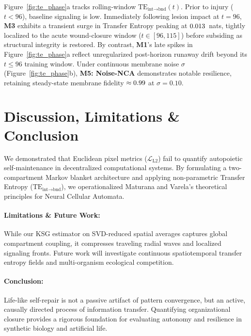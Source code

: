 \documentclass[10pt,twocolumn]{article}
\begin{document}
Figure~\ref{fig:te_phase}a tracks rolling-window $\text{TE}_{\text{int}\to\text{bnd}}(t)$. Prior to injury ($t < 96$), baseline signaling is low. Immediately following lesion impact at $t=96$, \textbf{M3} exhibits a transient surge in Transfer Entropy peaking at $0.013$~nats, tightly localized to the acute wound-closure window ($t \in [96, 115]$) before subsiding as structural integrity is restored. By contrast, \textbf{M1}'s late spikes in Figure~\ref{fig:te_phase}a reflect unregularized post-horizon runaway drift beyond its $t \le 96$ training window. Under continuous membrane noise $\sigma$ (Figure~\ref{fig:te_phase}b), \textbf{M5: Noise-NCA} demonstrates notable resilience, retaining steady-state membrane fidelity $\approx 0.99$ at $\sigma = 0.10$.

\section{Discussion, Limitations \& Conclusion}

We demonstrated that Euclidean pixel metrics ($\mathcal{L}_{\text{L2}}$) fail to quantify autopoietic self-maintenance in decentralized computational systems. By formulating a two-compartment Markov blanket architecture and applying non-parametric Transfer Entropy ($\text{TE}_{\text{int}\to\text{bnd}}$), we operationalized Maturana and Varela's theoretical principles for Neural Cellular Automata. 

\paragraph{Limitations \& Future Work:} While our KSG estimator on SVD-reduced spatial averages captures global compartment coupling, it compresses traveling radial waves and localized signaling fronts. Future work will investigate continuous spatiotemporal transfer entropy fields and multi-organism ecological competition.

\paragraph{Conclusion:} Life-like self-repair is not a passive artifact of pattern convergence, but an active, causally directed process of information transfer. Quantifying organizational closure provides a rigorous foundation for evaluating autonomy and resilience in synthetic biology and artificial life.

\begingroup
\small
\setlength{\bibsep}{0pt}


\endgroup
\end{document}
